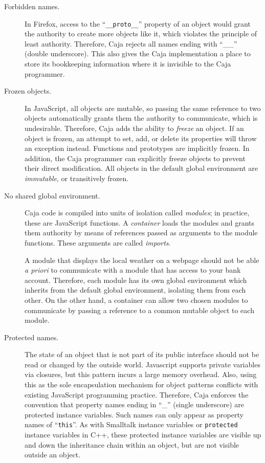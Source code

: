 \documentclass[letterpaper,twocolumn,10pt]{article}
\newcommand{\code}[1]{{\tt {#1}}}              %
\begin{document}
\begin{description}

  \item[Forbidden names.] In Firefox, access to the ``\code{\_\_proto\_\_}'' 
  property of an object would grant the authority to create more objects
  like it, which violates the principle of least authority.  Therefore, 
  Caja rejects all names ending with ``\_\_'' (double 
  underscore). This also gives the Caja implementation a place to store its 
  bookkeeping information where it is invisible to the Caja programmer.
 
  \item[Frozen objects.] In JavaScript, all objects are mutable, so passing
  the same reference to two objects automatically grants them the authority
  to communicate, which is undesirable.  
  Therefore, Caja adds the ability to \emph{freeze} an 
  object. If an object is frozen, an attempt to set, add, or 
  delete its properties will throw an exception instead. Functions and 
  prototypes are implicitly frozen. In addition, the Caja programmer can 
  explicitly freeze objects to prevent their direct modification. All objects 
  in the default global environment are \emph{immutable}, or transitively 
  frozen.
  
  \item[No shared global environment.] Caja code is compiled into units of
  isolation called \emph{modules}; in practice, these are JavaScript functions.  
  A \emph{container} loads the modules and grants them authority by means of 
  references passed as arguments to the module functions.  These arguments
  are called \emph{imports}.
  
  A module that displays the local 
  weather on a webpage should not be able \emph{a priori} to communicate 
  with a module that has access to your bank account. Therefore, each 
  module has its own global environment which inherits 
  from the default global environment, isolating them from each other.
  On the other hand, a container can allow two chosen modules to communicate
  by passing a reference to a common mutable object to each module.

  \item[Protected names.] The state of an object that is not part of its 
  public interface should not be read or changed by the outside world.  
  Javascript supports private variables via closures, but this pattern 
  incurs a large memory overhead.  Also, using this as the sole 
  encapsulation mechanism for object patterns conflicts with existing 
  JavaScript programming practice.  Therefore, Caja enforces the
  convention that property names ending in ``\_'' (single underscore) 
  are protected instance variables.  Such names can only appear as property names 
  of ``\code{this}''. As with Smalltalk instance variables or 
  \code{protected} instance variables in C++, these protected instance 
  variables are visible up and down the inheritance chain within an object, 
  but are not visible outside an object.


\end{description}
\end{document}
